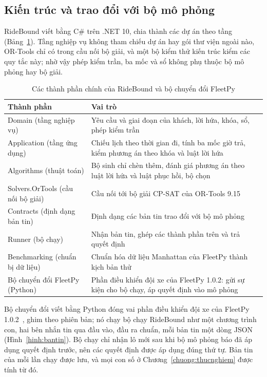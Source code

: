 \subsection{Kiến trúc và trao đổi với bộ mô phỏng}
\label{muc:kientruc}

RideBound viết bằng C\# trên .NET 10, chia thành các dự án theo tầng (Bảng~\ref{bang:kientruc}). Tầng nghiệp vụ
không tham chiếu dự án hay gói thư viện ngoài nào, OR-Tools chỉ có trong cầu nối bộ giải, và một bộ kiểm thử kiến
trúc kiểm các quy tắc này; nhờ vậy phép kiểm trần, ba mốc và sổ không phụ thuộc bộ mô phỏng hay bộ giải.

\begin{table}[htbp]
\centering
\caption{Các thành phần chính của RideBound và bộ chuyển đổi FleetPy}
\label{bang:kientruc}
\small
\begin{tabular}{@{}p{4.6cm}p{10.2cm}@{}}
\toprule
\textbf{Thành phần} & \textbf{Vai trò}\\
\midrule
Domain (tầng nghiệp vụ) & Yêu cầu và giai đoạn của khách, lời hứa, khóa, sổ, phép kiểm trần\\
Application (tầng ứng dụng) & Chiếu lịch theo thời gian đi, tính ba mốc giờ trả, kiểm phương án theo khóa và luật
lời hứa\\
Algorithms (thuật toán) & Bộ sinh chỉ chèn thêm, đánh giá phương án theo luật lời hứa và luật phục hồi, bộ chọn\\
Solvers.OrTools (cầu nối bộ giải) & Cầu nối tới bộ giải CP-SAT của OR-Tools 9.15\\
Contracts (định dạng bản tin) & Định dạng các bản tin trao đổi với bộ mô phỏng\\
Runner (bộ chạy) & Nhận bản tin, ghép các thành phần trên và trả quyết định\\
Benchmarking (chuẩn bị dữ liệu) & Chuẩn hóa dữ liệu Manhattan của FleetPy thành kịch bản thử\\
Bộ chuyển đổi FleetPy (Python) & Phần điều khiển đội xe của FleetPy 1.0.2: gửi sự kiện cho bộ chạy, áp quyết định
vào mô phỏng\\
\bottomrule
\end{tabular}
\end{table}

Bộ chuyển đổi viết bằng Python đóng vai phần điều khiển đội xe của FleetPy 1.0.2~\cite{engelhardt2026}, ghim theo
phiên bản; nó chạy bộ chạy RideBound như một chương trình con, hai bên nhắn tin qua đầu vào, đầu ra chuẩn, mỗi bản
tin một dòng JSON (Hình~\ref{hinh:bantin}). Bộ chạy chỉ nhận lô mới sau khi bộ mô phỏng báo đã áp dụng quyết định
trước, nên các quyết định được áp dụng đúng thứ tự. Bản tin của mỗi lần chạy được lưu, và mọi con số ở
Chương~\ref{chuong:thucnghiem} được tính từ đó.

